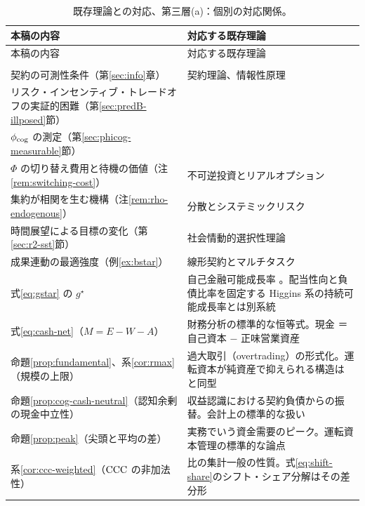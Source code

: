 \begin{longtable}{@{}>{\raggedright\arraybackslash}p{}>{\raggedright\arraybackslash}p{}@{}}
\caption{既存理論との対応、第三層(a)：個別の対応関係。}\label{tab:priorwork-layer3}\\
\toprule
本稿の内容 & 対応する既存理論 \\
\midrule
\endfirsthead
\toprule
本稿の内容 & 対応する既存理論 \\
\midrule
\endhead
\midrule
\multicolumn{2}{r}{\footnotesize（次頁へ続く）}\\
\endfoot
\bottomrule
\endlastfoot
契約の可測性条件（第\ref{sec:info}章） & 契約理論、情報性原理 \cite{holmstrom1979} \\
リスク・インセンティブ・トレードオフの実証的困難（第\ref{sec:predB-illposed}節） & \cite{prendergast1999,prendergast2002} \\
$\phi_{\rm cog}$ の測定（第\ref{sec:phicog-measurable}節） & \cite{dellavigna2006,einav2025} \\
$\Phi$ の切り替え費用と待機の価値（注\ref{rem:switching-cost}） & 不可逆投資とリアルオプション \cite{dixit1994} \\
集約が相関を生む機構（注\ref{rem:rho-endogenous}） & 分散とシステミックリスク \cite{wagner2010,ibragimov2011} \\
時間展望による目標の変化（第\ref{sec:r2-sst}節） & 社会情動的選択性理論 \cite{carstensen1999} \\
成果連動の最適強度（例\ref{ex:bstar}） & 線形契約とマルチタスク \cite{holmstrom1991} \\
式\eqref{eq:gstar} の $g^\star$ & 自己金融可能成長率 \cite{churchill2001}。配当性向と負債比率を固定する Higgins 系の持続可能成長率とは別系統 \\
式\eqref{eq:cash-net}（$M=E-W-A$） & 財務分析の標準的な恒等式。現金 ＝ 自己資本 $-$ 正味営業資産 \\
命題\ref{prop:fundamental}、系\ref{cor:rmax}（規模の上限） & 過大取引（overtrading）の形式化。運転資本が純資産で抑えられる構造は \cite{kiyotaki1997} と同型 \\
命題\ref{prop:cog-cash-neutral}（認知余剰の現金中立性） & 収益認識における契約負債からの振替。会計上の標準的な扱い \\
命題\ref{prop:peak}（尖頭と平均の差） & 実務でいう資金需要のピーク。運転資本管理の標準的な論点 \\
系\ref{cor:ccc-weighted}（$\mathrm{CCC}$ の非加法性） & 比の集計一般の性質。式\eqref{eq:shift-share}のシフト・シェア分解はその差分形 \\

\end{longtable}
